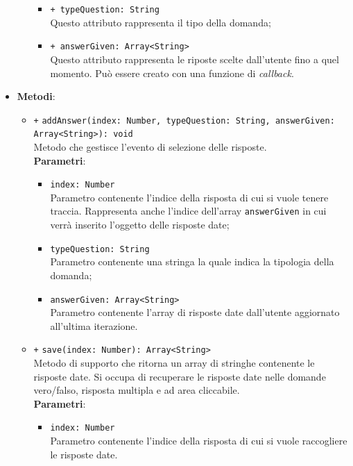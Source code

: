 \begin{itemize}
\begin{itemize}
		\begin{itemize}
			\item \texttt{+ typeQuestion: String} \\
			Questo attributo rappresenta il tipo della domanda;
			\item \texttt{+ answerGiven: Array<String>} \\
			Questo attributo rappresenta le riposte scelte dall'utente fino a quel momento. Può essere creato con una funzione di \textit{callback}.
		\end{itemize}
	\end{itemize}
	\item \textbf{Metodi}: 
	\begin{itemize}
	\item \texttt{+} \texttt{addAnswer(index: Number, typeQuestion: String, answerGiven: \\Array<String>): void} \\
	Metodo che gestisce l'evento di selezione delle risposte. \\
	\textbf{Parametri}:
	\begin{itemize}
		\item \texttt{index: Number} \\
		Parametro contenente l'indice della risposta di cui si vuole tenere traccia. Rappresenta anche l'indice dell'array \texttt{answerGiven} in cui verrà inserito l'oggetto delle risposte date;
		\item \texttt{typeQuestion: String} \\
		Parametro contenente una stringa la quale indica la tipologia della domanda;
		\item \texttt{answerGiven: Array<String>} \\
		Parametro contenente l'array di risposte date dall'utente aggiornato all'ultima iterazione.
	\end{itemize}
	\item \texttt{+} \texttt{save(index: Number): Array<String>} \\
	Metodo di supporto che ritorna un array di stringhe contenente le risposte date. Si occupa di recuperare le risposte date nelle domande vero/falso, risposta multipla e ad area cliccabile.\\
	\textbf{Parametri}:
	\begin{itemize}
		\item \texttt{index: Number} \\
		Parametro contenente l'indice della risposta di cui si vuole raccogliere le risposte date. 

\end{itemize}
\end{itemize}
\end{itemize}
